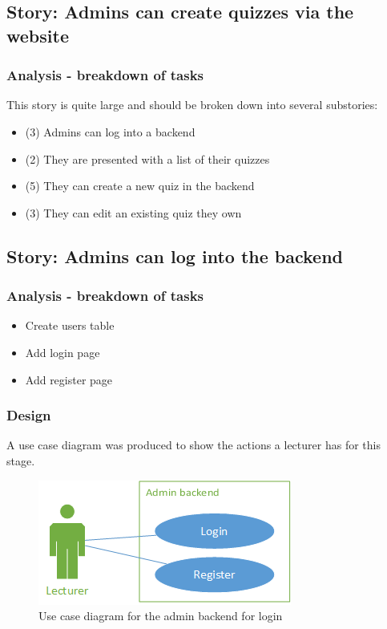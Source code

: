 \subsection{Story: Admins can create quizzes via the website}
\subsubsection{Analysis - breakdown of tasks}
This story is quite large and should be broken down into several substories:
\begin{itemize}
	\item (3) Admins can log into a backend
	\item (2) They are presented with a list of their quizzes
	\item (5) They can create a new quiz in the backend
	\item (3) They can edit an existing quiz they own
\end{itemize}
\newpage

\subsection{Story: Admins can log into the backend}
\subsubsection{Analysis - breakdown of tasks}
\begin{itemize}
	\item Create users table
	\item Add login page
	\item Add register page
\end{itemize}
\subsubsection{Design}
A use case diagram was produced to show the actions a lecturer has for this stage.

\begin{figure}[H]
	\caption{Use case diagram for the admin backend for login}
	\centerline{\includegraphics{Chapter2/Iter-1/iter-1-use-case}}
	\label{fig:login-use-case}
\end{figure}

